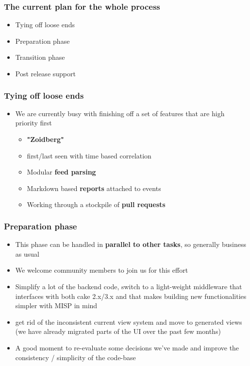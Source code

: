 \begin{frame}
  \frametitle{The current plan for the whole process}
  \begin{itemize}
    \item Tying off loose ends
    \item Preparation phase
    \item Transition phase
    \item Post release support
  \end{itemize}
\end{frame}

\begin{frame}
  \frametitle{Tying off loose ends}
  \begin{itemize}
    \item We are currently busy with finishing off a set of features that are high priority first
    \begin{itemize}
      \item {\bf "Zoidberg"} \item first/last seen with time based correlation
      \item Modular {\bf feed parsing}
      \item Markdown based {\bf reports} attached to events
      \item Working through a stockpile of {\bf pull requests}
    \end{itemize}
  \end{itemize}
\end{frame}

\begin{frame}
  \frametitle{Preparation phase}
  \begin{itemize}
    \item This phase can be handled in {\bf parallel to other tasks}, so generally business as usual
    \item We welcome community members to join us for this effort
    \item Simplify a lot of the backend code, switch to a light-weight middleware that interfaces with both cake 2.x/3.x and that makes building new functionalities simpler with MISP in mind
    \item get rid of the inconsistent current view system and move to generated views (we have already migrated parts of the UI over the past few months)
    \item A good moment to re-evaluate some decisions we've made and improve the consistency / simplicity of the code-base
  \end{itemize}
\end{frame}

